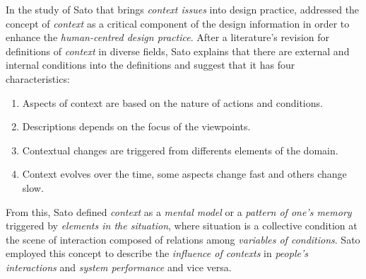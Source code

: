 In the study of Sato\cite{sato2004context} that brings \textit{context
issues} into design practice, addressed the concept of
\textit{context} as a critical component of the design information in
order to enhance the \textit{human-centred design practice}. After a
literature's revision for  definitions of \textit{context} in diverse
fields, Sato explains that there are external and internal conditions
into the definitions and suggest that it has four characteristics:
\begin{enumerate}  
\item Aspects of context are based on the nature of actions and 
conditions.
\item Descriptions depends on the focus of the viewpoints.
\item Contextual changes are triggered from differents elements 
of the domain. 
\item Context evolves over the time, some aspects change fast
and others change slow. 
\end{enumerate} 
From this, Sato defined \textit{context} as a \textit{mental model} or a
\textit{pattern of one's memory} triggered by \textit{elements in the
situation}, where situation is a collective condition at the scene of
interaction composed of relations among \textit{variables of
conditions}. Sato employed this concept to describe the
\textit{influence of contexts} in \textit{people's interactions} and
\textit{system performance} and vice versa.\\

